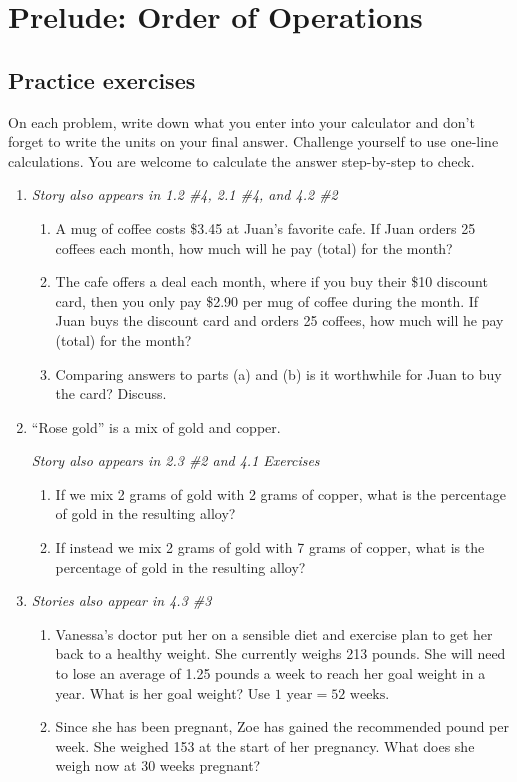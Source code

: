 
\section{Prelude: Order of Operations} 

\subsection*{Practice exercises}

On each problem, write down what you enter into your calculator and don't forget to write the units on your final answer.  Challenge yourself to use one-line calculations. You are welcome to calculate the answer step-by-step to check.

\begin{enumerate}

\item  \emph{Story also appears in 1.2 \#4, 2.1 \#4, and 4.2 \#2}

\begin{enumerate}
\item A mug of coffee costs \$3.45 at Juan's favorite cafe.  If Juan orders 25 coffees each month, how much will he pay (total) for the month?
\vfill
\item The cafe offers a deal each month, where if you buy their \$10 discount card, then you only pay \$2.90 per mug of coffee during the month. If Juan buys the discount card and orders 25 coffees, how much will he pay (total) for the month?  
\vfill
\item Comparing answers to parts (a) and (b) is it worthwhile for Juan to buy the card? Discuss.
\vfill
\end{enumerate}

\item ``Rose gold'' is a mix of gold and copper. 

\hfill \emph{Story also appears in 2.3 \#2 and 4.1 Exercises}
\begin{enumerate}
\item If we mix 2 grams of gold with 2 grams of copper, what is the percentage of gold in the resulting alloy?
\vfill
\item If instead we mix 2 grams of gold with 7 grams of copper, what is the percentage of gold in the resulting alloy?
\vfill
\end{enumerate}
  
\newpage

\item \emph{Stories also appear in 4.3 \#3}
\begin{enumerate}
\item Vanessa's doctor put her on a sensible diet and exercise plan to get her back to a healthy weight.  She currently weighs 213 pounds. She will need to lose an average of 1.25 pounds a week to reach her goal weight in a year.  What is her goal weight?  Use $1 \text{ year} =  52 \text{ weeks}$. \vfill
\item Since she has been pregnant, Zoe has gained the recommended  pound per week.  She weighed 153 at the start of her pregnancy.  What does she weigh now at 30 weeks pregnant? \vfill
\end{enumerate}


\end{enumerate}
